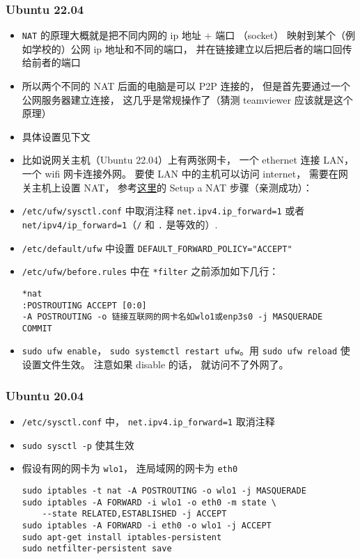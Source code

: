 \subsubsection{Ubuntu 22.04}
\begin{itemize}
\item \verb|NAT| 的原理大概就是把不同内网的 ip 地址 + 端口 （socket） 映射到某个（例如学校的）公网 ip 地址和不同的端口， 并在链接建立以后把后者的端口回传给前者的端口
\item 所以两个不同的 NAT 后面的电脑是可以 P2P 连接的， 但是首先要通过一个公网服务器建立连接， 这几乎是常规操作了（猜测 teamviewer 应该就是这个原理）
\item 具体设置见下文
\item 比如说网关主机（Ubuntu 22.04）上有两张网卡， 一个 ethernet 连接 LAN， 一个 wifi 网卡连接外网。 要使 LAN 中的主机可以访问 internet， 需要在网关主机上设置 NAT， 参考\href{https://unix.stackexchange.com/questions/575178/sharing-wifi-internet-through-ethernet-interface}{这里}的 Setup a NAT 步骤（亲测成功）：
\item \verb|/etc/ufw/sysctl.conf| 中取消注释 \verb|net.ipv4.ip_forward=1| 或者 \verb|net/ipv4/ip_forward=1|（\verb`/` 和 \verb`.` 是等效的）.
\item \verb|/etc/default/ufw| 中设置 \verb|DEFAULT_FORWARD_POLICY="ACCEPT"|
\item \verb|/etc/ufw/before.rules| 中在 \verb`*filter` 之前添加如下几行：
\begin{lstlisting}[language=none]
*nat
:POSTROUTING ACCEPT [0:0]
-A POSTROUTING -o 链接互联网的网卡名如wlo1或enp3s0 -j MASQUERADE
COMMIT
\end{lstlisting}
\item \verb|sudo ufw enable|， \verb|sudo systemctl restart ufw|。用 \verb`sudo ufw reload` 使设置文件生效。 注意如果 disable 的话， 就访问不了外网了。
\end{itemize}

\subsubsection{Ubuntu 20.04}
\begin{itemize}
\item \verb`/etc/sysctl.conf` 中， \verb`net.ipv4.ip_forward=1` 取消注释
\item \verb`sudo sysctl -p` 使其生效
\item 假设有网的网卡为 \verb`wlo1`， 连局域网的网卡为 \verb`eth0`
\begin{lstlisting}[language=none]
sudo iptables -t nat -A POSTROUTING -o wlo1 -j MASQUERADE
sudo iptables -A FORWARD -i wlo1 -o eth0 -m state \
    --state RELATED,ESTABLISHED -j ACCEPT
sudo iptables -A FORWARD -i eth0 -o wlo1 -j ACCEPT
sudo apt-get install iptables-persistent
sudo netfilter-persistent save
\end{lstlisting}
\end{itemize}

